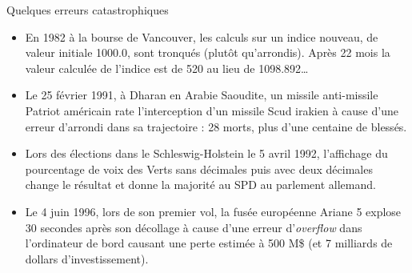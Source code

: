 \documentclass[10pt]{beamer}
\begin{document}
\begin{frame}{Quelques erreurs catastrophiques}
  \begin{itemize}
  \item En 1982  à la bourse de Vancouver, les calculs sur un indice nouveau, de valeur initiale 1000.0, sont tronqués (plutôt qu’arrondis). Après 22 mois la valeur calculée de l’indice est de 520 au lieu de 1098.892\dots
  \item Le 25 février 1991, à Dharan en Arabie Saoudite, un missile anti-missile Patriot américain rate l’interception d’un missile Scud irakien à cause d'une erreur d'arrondi dans sa trajectoire : 28 morts, plus d’une centaine de blessés.
  \item Lors des élections dans le Schleswig-Holstein le 5 avril 1992, l’affichage du pourcentage de voix des Verts sans décimales puis avec deux décimales change le résultat et donne la majorité au SPD au parlement allemand.
  \item Le 4 juin 1996, lors de son premier vol, la fusée européenne Ariane 5 explose 30 secondes après son décollage à cause d'une erreur d'\textit{overflow} dans l'ordinateur de bord causant une perte estimée à 500 M\$ (et 7 milliards de dollars d’investissement).
\end{itemize}

\end{frame}







\end{document}
